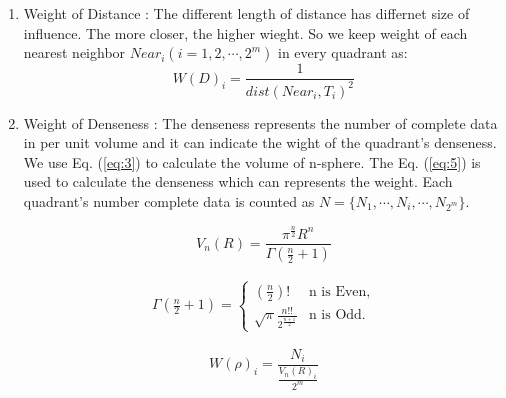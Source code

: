 \documentclass[print]{jicspack}
\begin{document}
\begin{enumerate}[(1)]
\item Weight of Distance : The different length of distance has differnet size of influence. The more closer, the higher wieght. So we keep weight of each nearest neighbor $Near_i (i=1, 2, \cdots, 2^m)$ in every quadrant as:
\begin{equation}
\label{eq:2}
W(D)_i = \frac{1}{dist(Near_i, T_i)^2}
\end{equation}
\item Weight of Denseness : The denseness represents the number of complete data in per unit volume and it can indicate the wight of the quadrant's denseness. We use Eq. (\ref{eq:3}) to calculate the volume of n-sphere. The Eq. (\ref{eq:5}) is used to calculate the denseness which can represents the weight. Each quadrant's number complete data is counted as $N = \{N_1, \cdots, N_i, \cdots, N_{2^m}\}$.

\begin{equation}
\label{eq:3}
V_n(R) = \frac{\pi^{\frac{n}{2}}R^n}{\Gamma (\frac{n}{2} + 1)}
\end{equation}

\begin{eqnarray}\label{eq:4}
\Gamma(\frac{n}{2} + 1) = \left\{\begin{array}{ll}(\frac{n}{2})! & \mbox{n is Even} ,\\\sqrt{\pi}\frac{n!!}{2^{\frac{n+1}{2}}} & \mbox{n is Odd}.\end{array}\right.
\end{eqnarray}

\begin{equation}
\label{eq:5}
W(\rho)_i = \frac{N_i}{\frac{V_n(R)_i}{2^m}}
\end{equation}


\end{enumerate}
\end{document}
